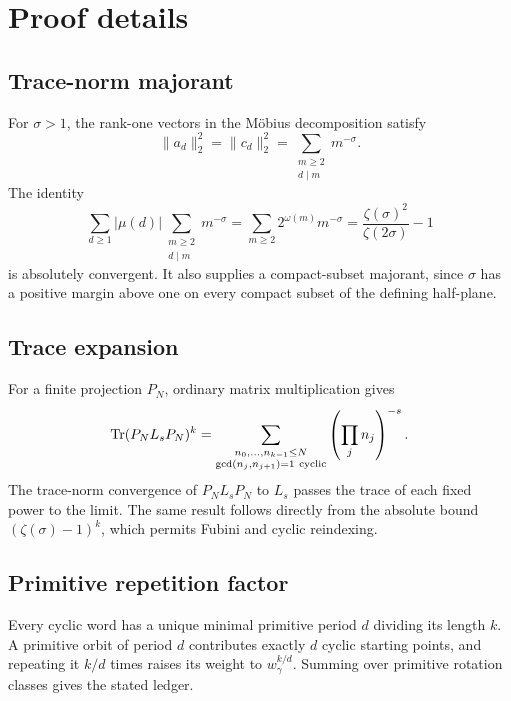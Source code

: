 \section{Proof details}

\subsection{Trace-norm majorant}

For \(\sigma>1\), the rank-one vectors in the Möbius decomposition satisfy
\[
\lVert a_d\rVert_2^2=\lVert c_d\rVert_2^2
=\sum_{\substack{m\geq2\\d\mid m}}m^{-\sigma}.
\]
The identity
\[
\sum_{d\geq1}|\mu(d)|\sum_{\substack{m\geq2\\d\mid m}}m^{-\sigma}
=\sum_{m\geq2}2^{\omega(m)}m^{-\sigma}
=\frac{\zeta(\sigma)^2}{\zeta(2\sigma)}-1
\]
is absolutely convergent.  It also supplies a compact-subset majorant, since
\(\sigma\) has a positive margin above one on every compact subset of the
defining half-plane.

\subsection{Trace expansion}

For a finite projection \(P_N\), ordinary matrix multiplication gives
\[
\operatorname{Tr}(P_NL_sP_N)^k
=\sum_{\substack{n_0,\ldots,n_{k-1}\leq N\\
\operatorname{gcd}(n_j,n_{j+1})=1\ {\rm cyclic}}}
\left(\prod_jn_j\right)^{-s}.
\]
The trace-norm convergence of \(P_NL_sP_N\) to \(L_s\) passes the trace of each
fixed power to the limit.  The same result follows directly from the
absolute bound \((\zeta(\sigma)-1)^k\), which permits Fubini and cyclic
reindexing.

\subsection{Primitive repetition factor}

Every cyclic word has a unique minimal primitive period \(d\) dividing its
length \(k\).  A primitive orbit of period \(d\) contributes exactly \(d\)
cyclic starting points, and repeating it \(k/d\) times raises its weight to
\(w_\gamma^{k/d}\).  Summing over primitive rotation classes gives the stated
ledger.
